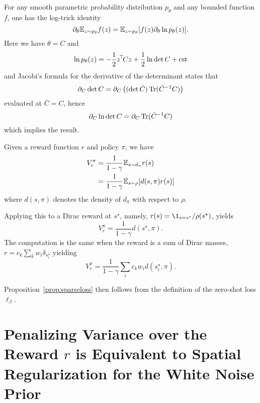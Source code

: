 \documentclass[11pt,a4paper]{article}
\begin{document}
\begin{dem}
For any smooth parametric probability distribution $p_\theta$ and any bounded
function $f$, one has the log-trick identity
\begin{equation}
\partial_\theta \mathbb{E}_{z\sim p_\theta} f(z)=\mathbb{E}_{z\sim p_\theta}[f(z)\partial_\theta \ln
p_\theta(z)].
\end{equation}
Here we have $\theta=C$ and
\begin{equation}
\ln p_\theta(z)=-\frac12 z^{\!\top}\!Cz+\frac12 \ln \det C+\mathrm{cst}
\end{equation}
and Jacobi's formula for the derivative of the determinant states that
\begin{equation}
\partial_C \det C=\partial_C \left(
(\det \bar C) \operatorname{Tr}(\bar C^{-1}C)\right)
\end{equation}
evaluated at $\bar C=C$, hence
\begin{equation}
\partial_C \ln \det C=\partial_C \operatorname{Tr}(\bar C^{-1}C)
\end{equation}
which implies the result.
\end{dem}


\begin{dem}
Given a reward function $r$ and policy $\pi$, we have
\begin{align}
V^\pi_r&=\frac{1}{1-\gamma} \mathbb{E}_{s\sim d_\pi}r(s)
\\&=\frac{1}{1-\gamma} \mathbb{E}_{s\sim \rho} [d(s,\pi)r(s)]
\end{align}
where $d(s,\pi)$ denotes the density of $d_\pi$ with respect to $\rho$.

Applying this to a Dirac reward at $s^\star$, namely,
$r(s)=\1_{s=s^\star}/\rho(s^\star)$, yields
\begin{equation}
V^\pi_r=\frac{1}{1-\gamma} d(s^\star,\pi).
\end{equation}
The computation is the same when the reward is a sum of Dirac masses,
$r=c_k \sum_k w_i \delta_{s^\star_i}$
yielding
\begin{equation}
V^\pi_r=\frac{1}{1-\gamma} \sum_i c_k w_i d(s^\star_i,\pi).
\end{equation}

Proposition~\ref{prop:sparseloss} then follows from the definition of the
zero-shot loss $\ell_\beta$.
\end{dem}

\section{Penalizing Variance over the Reward $r$ is Equivalent to Spatial
Regularization for the White Noise Prior}
\label{sec:varianceregul}
\end{document}

